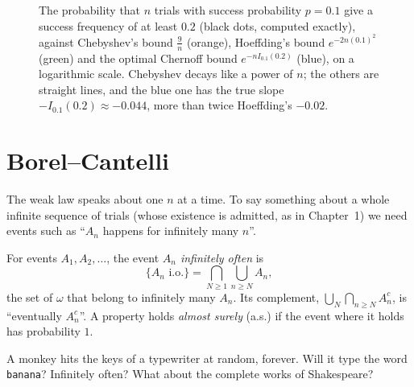 \begin{figure}[ht]
\centering
{}
\caption{The probability that $n$ trials with success probability $p=0.1$ give a success frequency of at least $0.2$ (black dots,
computed exactly), against Chebyshev's bound $\frac{9}{n}$ (orange), Hoeffding's bound $e^{-2n(0.1)^2}$ (green) and the optimal
Chernoff bound $e^{-nI_{0.1}(0.2)}$ (blue), on a logarithmic scale. Chebyshev decays like a power of $n$; the others are straight
lines, and the blue one has the true slope $-I_{0.1}(0.2)\approx-0.044$, more than twice Hoeffding's $-0.02$.}
\label{fig:chernoff}
\end{figure}

\section{Borel--Cantelli}\label{sec:bc}

The weak law speaks about one $n$ at a time. To say something about a whole infinite sequence of trials (whose
existence is admitted, as in Chapter~1) we need events such as ``$A_n$ happens for infinitely many $n$''.

\begin{definition}
For events $A_1,A_2,\ldots$, the event \emph{$A_n$ infinitely often} is
\[
\{A_n\text{ i.o.}\}=\bigcap_{N\ge1}\bigcup_{n\ge N}A_n,
\]
the set of $\omega$ that belong to infinitely many $A_n$. Its complement, $\bigcup_N\bigcap_{n\ge N}A_n^c$, is ``eventually $A_n^c$''. A property holds
\emph{almost surely} (a.s.) if the event where it holds has probability $1$.
\end{definition}

\begin{think}
A monkey hits the keys of a typewriter at random, forever. Will it type the word \texttt{banana}? Infinitely
often? What about the complete works of Shakespeare?
\end{think}

